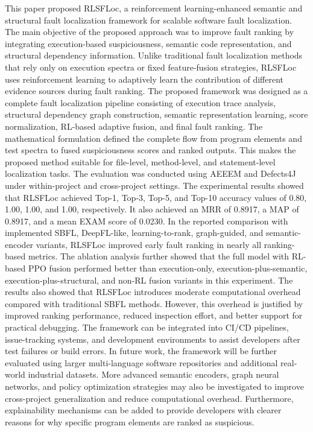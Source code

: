 \documentclass[article,article,submit,pdftex,moreauthors]{Definitions/mdpi}
\begin{document}
This paper proposed RLSFLoc, a reinforcement learning-enhanced semantic and structural fault localization framework for scalable software fault localization. The main objective of the proposed approach was to improve fault ranking by integrating execution-based suspiciousness, semantic code representation, and structural dependency information. Unlike traditional fault localization methods that rely only on execution spectra or fixed feature-fusion strategies, RLSFLoc uses reinforcement learning to adaptively learn the contribution of different evidence sources during fault ranking. The proposed framework was designed as a complete fault localization pipeline consisting of execution trace analysis, structural dependency graph construction, semantic representation learning, score normalization, RL-based adaptive fusion, and final fault ranking. The mathematical formulation defined the complete flow from program elements and test spectra to fused suspiciousness scores and ranked outputs. This makes the proposed method suitable for file-level, method-level, and statement-level localization tasks. The evaluation was conducted using AEEEM and Defects4J under within-project and cross-project settings. The experimental results showed that RLSFLoc achieved Top-1, Top-3, Top-5, and Top-10 accuracy values of 0.80, 1.00, 1.00, and 1.00, respectively. It also achieved an MRR of 0.8917, a MAP of 0.8917, and a mean EXAM score of 0.0230. In the reported comparison with implemented SBFL, DeepFL-like, learning-to-rank, graph-guided, and semantic-encoder variants, RLSFLoc improved early fault ranking in nearly all ranking-based metrics. The ablation analysis further showed that the full model with RL-based PPO fusion performed better than execution-only, execution-plus-semantic, execution-plus-structural, and non-RL fusion variants in this experiment. The results also showed that RLSFLoc introduces moderate computational overhead compared with traditional SBFL methods. However, this overhead is justified by improved ranking performance, reduced inspection effort, and better support for practical debugging. The framework can be integrated into CI/CD pipelines, issue-tracking systems, and development environments to assist developers after test failures or build errors. In future work, the framework will be further evaluated using larger multi-language software repositories and additional real-world industrial datasets. More advanced semantic encoders, graph neural networks, and policy optimization strategies may also be investigated to improve cross-project generalization and reduce computational overhead. Furthermore, explainability mechanisms can be added to provide developers with clearer reasons for why specific program elements are ranked as suspicious.
\end{document}
